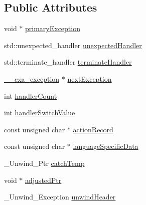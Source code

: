 \subsection*{Public Attributes}
\begin{DoxyCompactItemize}
\item 
void $\ast$ \hyperlink{struct____cxxabiv1_1_1____cxa__dependent__exception_a30589654a3d486998f5e1453ec6cc53f}{primary\-Exception}
\item 
std\-::unexpected\-\_\-handler \hyperlink{struct____cxxabiv1_1_1____cxa__dependent__exception_a96024f9dca222992f78b43661f734879}{unexpected\-Handler}
\item 
std\-::terminate\-\_\-handler \hyperlink{struct____cxxabiv1_1_1____cxa__dependent__exception_a56317adb0bf2e865d1470eb73cc16b6c}{terminate\-Handler}
\item 
\hyperlink{struct____cxxabiv1_1_1____cxa__exception}{\-\_\-\-\_\-cxa\-\_\-exception} $\ast$ \hyperlink{struct____cxxabiv1_1_1____cxa__dependent__exception_a0866b87d824ae3da0268bef4be1fb206}{next\-Exception}
\item 
int \hyperlink{struct____cxxabiv1_1_1____cxa__dependent__exception_ab30402cb89b42f3a5f56586bb6c5573f}{handler\-Count}
\item 
int \hyperlink{struct____cxxabiv1_1_1____cxa__dependent__exception_a9dc794d946fabdceb7ed7b6949d2a1b0}{handler\-Switch\-Value}
\item 
const unsigned char $\ast$ \hyperlink{struct____cxxabiv1_1_1____cxa__dependent__exception_a46978a9c82858934d89abf7ff49de1d9}{action\-Record}
\item 
const unsigned char $\ast$ \hyperlink{struct____cxxabiv1_1_1____cxa__dependent__exception_acfbd8763036d11784a4785e21dff728b}{language\-Specific\-Data}
\item 
\-\_\-\-Unwind\-\_\-\-Ptr \hyperlink{struct____cxxabiv1_1_1____cxa__dependent__exception_ab6f374db0f84f5c988a89b0b9fdb663f}{catch\-Temp}
\item 
void $\ast$ \hyperlink{struct____cxxabiv1_1_1____cxa__dependent__exception_a4ab0524d6e60405ee733bc23363c8f5b}{adjusted\-Ptr}
\item 
\-\_\-\-Unwind\-\_\-\-Exception \hyperlink{struct____cxxabiv1_1_1____cxa__dependent__exception_af9053e3aad7c19d930d3ee225b31daad}{unwind\-Header}
\end{DoxyCompactItemize}


